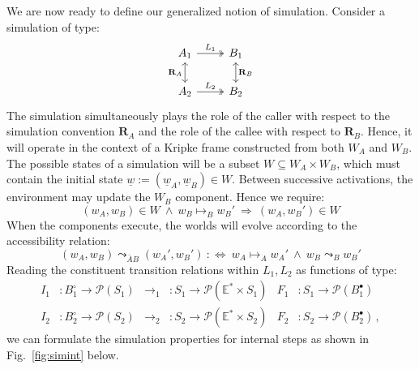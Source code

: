 \documentclass[acmsmall,screen,review,anonymous]{acmart}
\newcommand{\que}{\circ}
\newcommand{\ans}{\bullet}
\newcommand{\intl}[1]{\underline{#1}}
\begin{document}
We are now ready to define our generalized notion of simulation.
Consider a simulation of type:
\[
\begin{tikzcd}
  A_1 \ar[r, twoheadrightarrow, "L_1"] \ar[d, leftrightarrow, "\mathbf{R}_A"'] &
  B_1 \ar[d, leftrightarrow, "\mathbf{R}_B"] \\
  A_2 \ar[r, twoheadrightarrow, "L_2"] & B_2
\end{tikzcd}
\]
The simulation simultaneously
plays the role of the caller with respect to
the simulation convention $\mathbf{R}_A$ and
the role of the callee with respect to $\mathbf{R}_B$.
Hence,
it will operate in the context of a Kripke frame
constructed from both $W_A$ and $W_B$.
The possible states of a simulation will be a subset
$W \subseteq W_A \times W_B$,
which must contain
the initial state $\intl{w} := (\intl{w}_A, \intl{w}_B) \in W$.
Between successive activations,
the environment may update the $W_B$ component.
Hence we require:
\[
  (w_A, w_B) \in W \:\wedge\:
  w_B \mapsto_B w_B' \:\Rightarrow\:
  (w_A, w_B') \in W
\]
When the components execute,
the worlds will evolve according to
the accessibility relation:
\[
  (w_A, w_B) \leadsto_{\bar{A}B} (w_A', w_B') \::\Leftrightarrow\:
  w_A \mapsto_A w_A' \:\wedge\: w_B \leadsto_B w_B'
\]
Reading the constituent transition relations
within $L_1, L_2$ as functions of type:
\begin{align*}
  I_1 &: B_1^\que \rightarrow \mathcal{P}(S_1) &
  {\rightarrow_1} &: S_1 \rightarrow \mathcal{P}(\mathbb{E}^* \times S_1) &
  F_1 &: S_1 \rightarrow \mathcal{P}(B_1^\ans)
  \\
  I_2 &: B_2^\que \rightarrow \mathcal{P}(S_2) &
  {\rightarrow_2} &: S_2 \rightarrow \mathcal{P}(\mathbb{E}^* \times S_2) &
  F_2 &: S_2 \rightarrow \mathcal{P}(B_2^\ans)
  \,,
\end{align*}
we can formulate the simulation properties for internal steps
as shown in Fig.~\ref{fig:simint} below.
\end{document}
